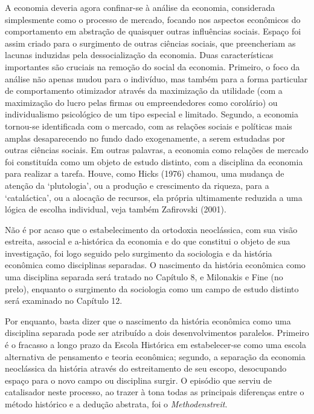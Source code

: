\documentclass[12pt]{article}
\begin{document}
A economia deveria agora confinar-se à análise da economia, considerada simplesmente como o processo de mercado, focando nos aspectos econômicos do comportamento em abstração de quaisquer outras influências sociais. Espaço foi assim criado para o surgimento de outras ciências sociais, que preencheriam as lacunas induzidas pela dessocialização da economia. Duas características importantes são cruciais na remoção do social da economia. Primeiro, o foco da análise não apenas mudou para o indivíduo, mas também para a forma particular de comportamento otimizador através da maximização da utilidade (com a maximização do lucro pelas firmas ou empreendedores como corolário) ou individualismo psicológico de um tipo especial e limitado. Segundo, a economia tornou-se identificada com o mercado, com as relações sociais e políticas mais amplas desaparecendo no fundo dado exogenamente, a serem estudadas por outras ciências sociais. Em outras palavras, a economia como relações de mercado foi constituída como um objeto de estudo distinto, com a disciplina da economia para realizar a tarefa. Houve, como Hicks (1976) chamou, uma mudança de atenção da ‘plutologia’, ou a produção e crescimento da riqueza, para a ‘cataláctica’, ou a alocação de recursos, ela própria ultimamente reduzida a uma lógica de escolha individual, veja também Zafirovski (2001).

Não é por acaso que o estabelecimento da ortodoxia neoclássica, com sua visão estreita, associal e a-histórica da economia e do que constitui o objeto de sua investigação, foi logo seguido pelo surgimento da sociologia e da história econômica como disciplinas separadas. O nascimento da história econômica como uma disciplina separada será tratado no Capítulo 8, e Milonakis e Fine (no prelo), enquanto o surgimento da sociologia como um campo de estudo distinto será examinado no Capítulo 12.

Por enquanto, basta dizer que o nascimento da história econômica como uma disciplina separada pode ser atribuído a dois desenvolvimentos paralelos. Primeiro é o fracasso a longo prazo da Escola Histórica em estabelecer-se como uma escola alternativa de pensamento e teoria econômica; segundo, a separação da economia neoclássica da história através do estreitamento de seu escopo, desocupando espaço para o novo campo ou disciplina surgir. O episódio que serviu de catalisador neste processo, ao trazer à tona todas as principais diferenças entre o método histórico e a dedução abstrata, foi o \textit{Methodenstreit}.
\end{document}
